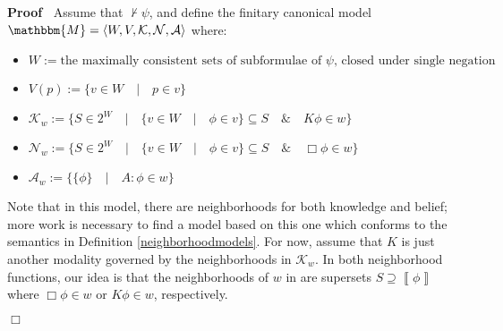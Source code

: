 \documentclass{article}
\newcommand{\assign}{:=}
\newenvironment{itemizedot}{\begin{itemize} \renewcommand{\labelitemi}{$\bullet$}\renewcommand{\labelitemii}{$\bullet$}\renewcommand{\labelitemiii}{$\bullet$}\renewcommand{\labelitemiv}{$\bullet$}}{\end{itemize}}
\newenvironment{proof}{\noindent\textbf{Proof\ }}{\hspace*{\fill}$\Box$\medskip}
\begin{document}
\begin{proof}
  Assume that $\nvdash \psi$, and define the finitary canonical model
  $\mathbbm{M}= \langle W, V, \mathcal{K}, \mathcal{N}, \mathcal{A} \rangle$
  where:
  \begin{itemizedot}
    \item $W \assign \text{the maximally consistent sets of subformulae of
    $\psi$, closed under single negation}$
    
    \item $V (p) \assign \{v \in W \hspace{1em} | \hspace{1em} p \in v\}$
    
    \item $\mathcal{K}_w \assign \{S \in 2^W \hspace{1em} | \hspace{1em} \{v
    \in W \hspace{1em} | \hspace{1em} \phi \in v\} \subseteq S \hspace{1em} \&
    \hspace{1em} K \phi \in w\}$
    
    \item $\mathcal{N}_w \assign \{S \in 2^W \hspace{1em} | \hspace{1em} \{v
    \in W \hspace{1em} | \hspace{1em} \phi \in v\} \subseteq S \hspace{1em} \&
    \hspace{1em} \Box \phi \in w\}$
    
    \item $\mathcal{A}_w \assign \{\{\phi\} \hspace{1em} | \hspace{1em} A :
    \phi \in w\}$
  \end{itemizedot}
  Note that in this model, there are neighborhoods for both knowledge and
  belief; more work is necessary to find a model based on this one which
  conforms to the semantics in Definition \ref{neighborhoodmodels}.  For now,
  assume that $K$ is just another modality governed by the neighborhoods in
  $\mathcal{K}_w$.  In both neighborhood functions, our idea is that the
  neighborhoods of $w$ in are supersets $S \supseteq \left\llbracket \phi
  \right\rrbracket$ where $\Box \phi \in w$ or $K \phi \in w$, respectively.
  
  
  

\end{proof}
\end{document}
